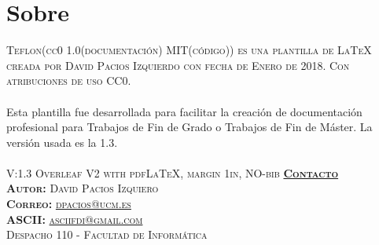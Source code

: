 \newpage
\chapter*{Sobre \teflon}
\noindent
\textsc{Teflon(cc0 1.0(documentación) MIT(código))%
es una plantilla de \LaTeX\phantom{} creada por David Pacios Izquierdo con fecha de Enero de 2018. Con atribuciones de uso CC0.}\\\\
\noindent
Esta plantilla fue desarrollada para facilitar la creación de documentación profesional para Trabajos de Fin de Grado o Trabajos de Fin de Máster. La versión usada es la 1.3.\\\\
\noindent
V:\textsc{1.3 Overleaf V2 with pdfLaTeX, margin 1in, NO-bib}
\vfill
\noindent
\textsc{\textbf{\underline{Contacto}}\\ \textbf{Autor:} David Pacios Izquiero \\ \textbf{Correo:} \url{dpacios@ucm.es}\\ \textbf{ASCII:} \url{asciifdi@gmail.com}\\ Despacho 110 - Facultad de Informática}